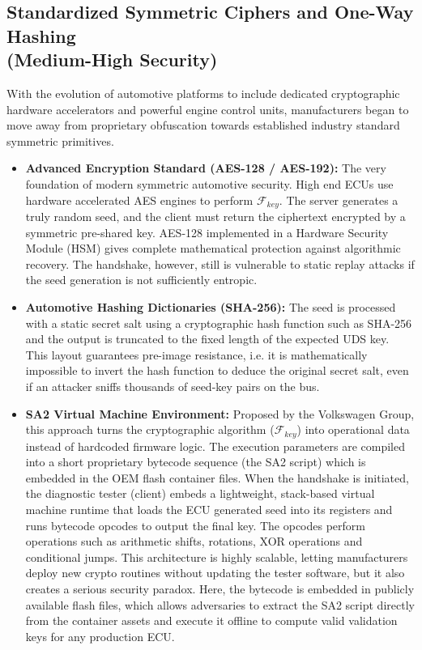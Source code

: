 \subsection[Standardized Symmetric Ciphers and One-Way Hashing]{Standardized Symmetric Ciphers and One-Way Hashing \\ (Medium-High Security)}
With the evolution of automotive platforms to include dedicated cryptographic hardware accelerators and powerful engine control units, manufacturers began to move away from proprietary obfuscation towards established industry standard symmetric primitives.\begin{itemize}
    \item \textbf{Advanced Encryption Standard (AES-128 / AES-192)\cite{UDS_SA_algorithms}:} The very foundation of modern symmetric automotive security. High end \glspl{ECU} use hardware accelerated AES engines to perform $\mathcal{F}_{key}$. The server generates a truly random seed, and the client must return the ciphertext encrypted by a symmetric pre-shared key. \gls{AES}-128 implemented in a Hardware Security Module (\gls{HSM}) gives complete mathematical protection against algorithmic recovery. The handshake, however, still is vulnerable to static replay attacks if the seed generation is not sufficiently entropic.
    \item \textbf{Automotive Hashing Dictionaries (SHA-256):} The seed is processed with a static secret salt using a cryptographic hash function such as \gls{SHA}-256 and the output is truncated to the fixed length of the expected UDS key. This layout guarantees pre-image resistance, i.e. it is mathematically impossible to invert the hash function to deduce the original secret salt, even if an attacker sniffs thousands of seed-key pairs on the bus.
    \item \textbf{SA2 Virtual Machine Environment\cite{UDS_SA_algorithms_sa2}:} Proposed by the Volkswagen Group, this approach turns the cryptographic algorithm ($\mathcal{F}_{key}$) into operational data instead of hardcoded firmware logic. The execution parameters are compiled into a short proprietary bytecode sequence (the SA2 script) which is embedded in the \gls{OEM} flash container files. When the handshake is initiated, the diagnostic tester (client) embeds a lightweight, stack-based virtual machine runtime that loads the ECU generated seed into its registers and runs bytecode opcodes to output the final key. The opcodes perform operations such as arithmetic shifts, rotations, XOR operations and conditional jumps. This architecture is highly scalable, letting manufacturers deploy new crypto routines without updating the tester software, but it also creates a serious security paradox. Here, the bytecode is embedded in publicly available flash files, which allows adversaries to extract the SA2 script directly from the container assets and execute it offline to compute valid validation keys for any production \gls{ECU}.

\end{itemize}
